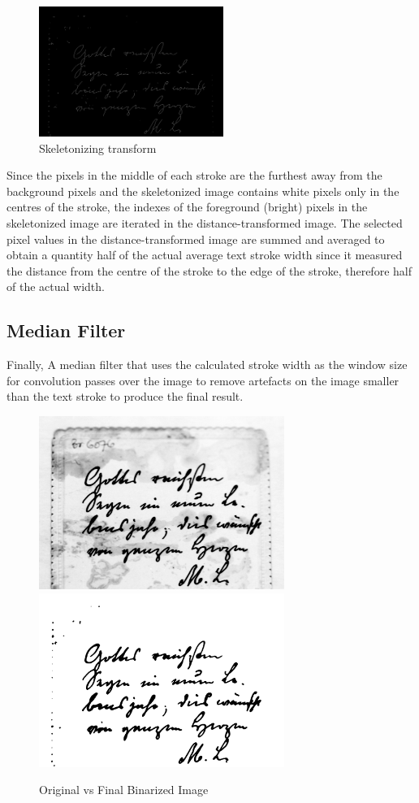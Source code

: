 \documentclass[a4paper, 12pt]{report}
\begin{document}
\begin{figure}[ht]
    \centering
    \includegraphics[width=6cm]{skeletonized.png}
    \caption{Skeletonizing transform}
    \label{fig:6}
\end{figure}

Since the pixels in the middle of each stroke are the furthest away from the
background pixels and the skeletonized image contains white pixels only in the
centres of the stroke, the indexes of the foreground (bright) pixels in the
skeletonized image are iterated in the distance-transformed image. The selected
pixel values in the distance-transformed image are summed and averaged to
obtain a quantity half of the actual average text stroke width since it
measured the distance from the centre of the stroke to the edge of the stroke,
therefore half of the actual width.

\subsection{Median Filter}
Finally, A median filter that uses the calculated stroke width as the window
size for convolution passes over the image to remove artefacts on the image
smaller than the text stroke to produce the final result.

\begin{figure}[ht]
    \centering
    \includegraphics[width=8cm]{original.png}
    \includegraphics[width=8cm]{output.png}
    \caption{Original vs Final Binarized Image}
    \label{fig:7}
\end{figure}
\end{document}

